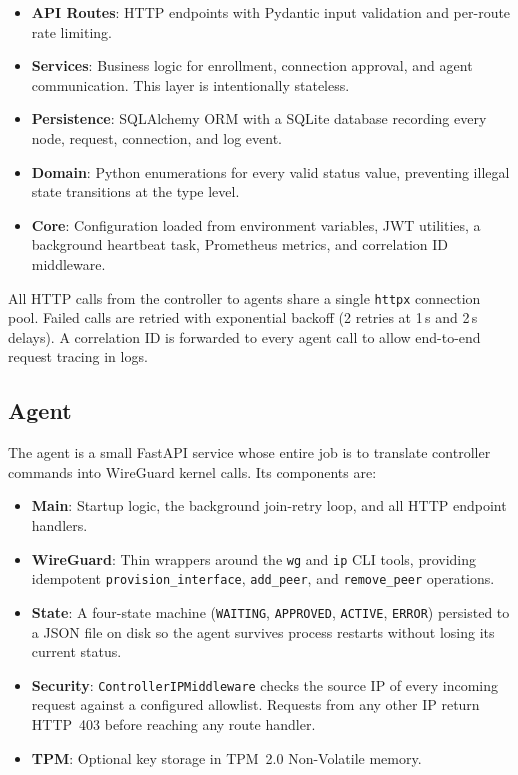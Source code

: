 \documentclass[conference]{IEEEtran}
\begin{document}
\begin{itemize}
  \item \textbf{API Routes}: HTTP endpoints with Pydantic input validation
        and per-route rate limiting.
  \item \textbf{Services}: Business logic for enrollment, connection approval,
        and agent communication. This layer is intentionally stateless.
  \item \textbf{Persistence}: SQLAlchemy ORM with a SQLite database recording
        every node, request, connection, and log event.
  \item \textbf{Domain}: Python enumerations for every valid status value,
        preventing illegal state transitions at the type level.
  \item \textbf{Core}: Configuration loaded from environment variables,
        JWT utilities, a background heartbeat task, Prometheus metrics, and
        correlation ID middleware.
\end{itemize}

All HTTP calls from the controller to agents share a single \texttt{httpx}
connection pool. Failed calls are retried with exponential backoff (2 retries
at 1\,s and 2\,s delays). A correlation ID is forwarded to every agent call
to allow end-to-end request tracing in logs.

\subsection{Agent}

The agent is a small FastAPI service whose entire job is to translate
controller commands into WireGuard kernel calls. Its components are:

\begin{itemize}
  \item \textbf{Main}: Startup logic, the background join-retry loop, and
        all HTTP endpoint handlers.
  \item \textbf{WireGuard}: Thin wrappers around the \texttt{wg} and
        \texttt{ip} CLI tools, providing idempotent \texttt{provision\_interface},
        \texttt{add\_peer}, and \texttt{remove\_peer} operations.
  \item \textbf{State}: A four-state machine (\texttt{WAITING},
        \texttt{APPROVED}, \texttt{ACTIVE}, \texttt{ERROR}) persisted to a
        JSON file on disk so the agent survives process restarts without
        losing its current status.
  \item \textbf{Security}: \texttt{ControllerIPMiddleware} checks the source
        IP of every incoming request against a configured allowlist. Requests
        from any other IP return HTTP~403 before reaching any route handler.
  \item \textbf{TPM}: Optional key storage in TPM~2.0 Non-Volatile memory.
\end{itemize}
\end{document}
